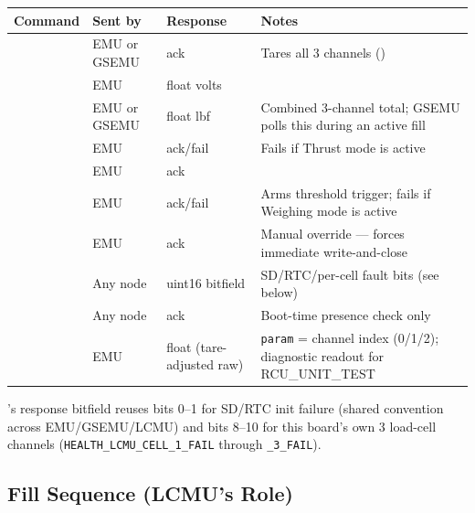 ﻿\documentclass[11pt,letterpaper]{article}
\begin{document}
\begin{center}
\begin{tabularx}{\textwidth}{@{}llp{2.6cm}Y@{}}
\toprule
Command & Sent by & Response & Notes \\
\midrule
{}                   & EMU or GSEMU & ack & Tares all 3 channels () \\
  & EMU          & float volts & \\
& EMU or GSEMU & float lbf & Combined 3-channel total; GSEMU polls this during an active fill \\
 & EMU        & ack/fail & Fails if Thrust mode is active \\
  & EMU        & ack      & \\
 & EMU        & ack/fail & Arms threshold trigger; fails if Weighing mode is active \\
  & EMU        & ack      & Manual override --- forces immediate write-and-close \\
      & Any node   & uint16 bitfield & SD/RTC/per-cell fault bits (see below) \\
                     & Any node   & ack      & Boot-time presence check only \\
           & EMU        & float (tare-adjusted raw) & \texttt{param} = channel index (0/1/2); diagnostic readout for RCU\_UNIT\_TEST \\
\bottomrule
\end{tabularx}
\end{center}

's response bitfield reuses bits 0--1 for
SD/RTC init failure (shared convention across EMU/GSEMU/LCMU) and bits
8--10 for this board's own 3 load-cell channels
(\texttt{HEALTH\_LCMU\_CELL\_1\_FAIL} through \texttt{\_3\_FAIL}).

\subsection{Fill Sequence (LCMU's Role)}
\end{document}

